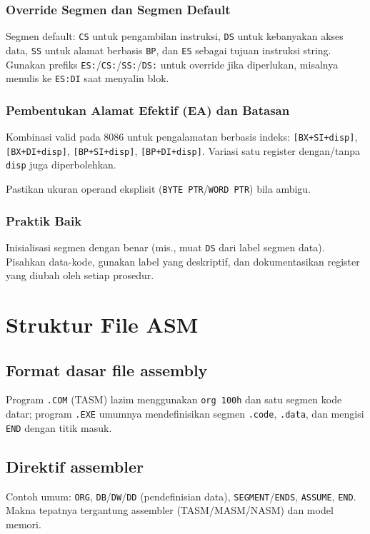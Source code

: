 \subsubsection{Override Segmen dan Segmen Default}
Segmen default: \texttt{CS} untuk pengambilan instruksi, \texttt{DS} untuk kebanyakan akses data, \texttt{SS} untuk alamat berbasis \texttt{BP}, dan \texttt{ES} sebagai tujuan instruksi string. Gunakan prefiks \texttt{ES:}/\texttt{CS:}/\texttt{SS:}/\texttt{DS:} untuk override jika diperlukan, misalnya menulis ke \texttt{ES:DI} saat menyalin blok.

\subsubsection{Pembentukan Alamat Efektif (EA) dan Batasan}
Kombinasi valid pada 8086 untuk pengalamatan berbasis indeks: \texttt{[BX+SI+disp]}, \texttt{[BX+DI+disp]}, \texttt{[BP+SI+disp]}, \texttt{[BP+DI+disp]}. Variasi satu register dengan/tanpa \texttt{disp} juga diperbolehkan. 

Pastikan ukuran operand eksplisit (\texttt{BYTE PTR}/\texttt{WORD PTR}) bila ambigu.

\subsubsection{Praktik Baik}
Inisialisasi segmen dengan benar (mis., muat \texttt{DS} dari label segmen data). Pisahkan data-kode, gunakan label yang deskriptif, dan dokumentasikan register yang diubah oleh setiap prosedur.

\section{Struktur File ASM}
\subsection{Format dasar file assembly}
Program \texttt{.COM} (TASM) lazim menggunakan \texttt{org 100h} dan satu segmen kode datar; program \texttt{.EXE} umumnya mendefinisikan segmen \texttt{.code}, \texttt{.data}, dan mengisi \texttt{END} dengan titik masuk.

\subsection{Direktif assembler}
Contoh umum: \texttt{ORG}, \texttt{DB}/\texttt{DW}/\texttt{DD} (pendefinisian data), \texttt{SEGMENT}/\texttt{ENDS}, \texttt{ASSUME}, \texttt{END}. Makna tepatnya tergantung assembler (TASM/MASM/NASM) dan model memori.

